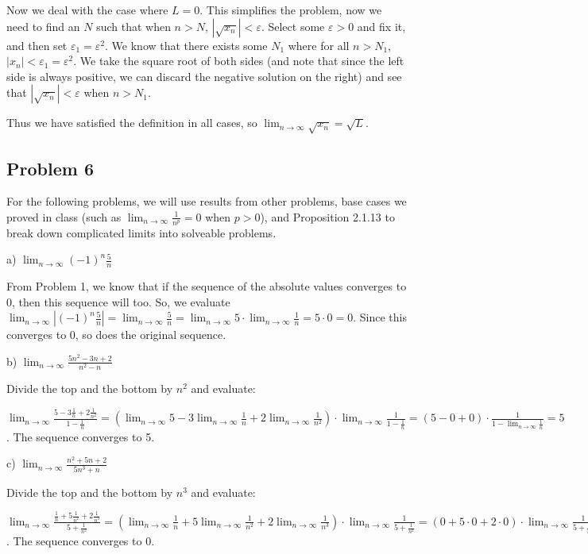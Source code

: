 \documentclass[11pt]{article}
\begin{document}
Now we deal with the case where $L=0$. This simplifies the problem, now
we need to find an $N$ such that when $n > N$, $\left|\sqrt{x_n}\right|< \varepsilon$.
Select some $\varepsilon > 0$ and fix it, and then set $\varepsilon_1 = \varepsilon^2$.
We know that there exists some $N_1$ where for all $n > N_1$,
$|x_n| < \varepsilon_1 = \varepsilon^2$. We take the square root of both sides (and
note that since the left side is always positive, we can discard the negative 
solution on the right)
and see that $\left| \sqrt{x_n} \right| < \varepsilon$ when $n > N_1$. 

Thus we have satisfied the definition
in all cases, so $\lim_{n\to\infty} \sqrt{x_n} = \sqrt{L}$.

\subsection*{Problem 6}
For the following problems, we will use results from other problems, base cases
we proved in class (such as $\lim_{n\to\infty}\frac{1}{n^p}=0$ when $p>0$), 
and Proposition 2.1.13 to break down complicated limits
into solveable problems.

a) $\lim_{n\to\infty}(-1)^n\frac{5}{n}$

From Problem 1, we know that if the sequence of the absolute values converges to 0, then
this sequence will too. So, we evaluate
$\lim_{n\to\infty}\left|(-1)^n\frac{5}{n}\right| = \lim_{n\to\infty}\frac{5}{n}
= \lim_{n\to\infty}5\cdot\lim_{n\to\infty}\frac{1}{n} = 5\cdot0=0$.
Since this converges to 0, so does the original sequence.

b) $\lim_{n\to\infty}\frac{5n^2-3n+2}{n^2-n} $

Divide the top and the bottom by $n^2$ and evaluate:

$\lim_{n\to\infty}\frac{5-3\frac{1}{n}+2\frac{1}{n^2}}{1-\frac{1}{n}} =
(\lim_{n\to\infty}5-3\lim_{n\to\infty}\frac{1}{n}+2\lim_{n\to\infty}\frac{1}{n^2})
\cdot \lim_{n\to\infty}\frac{1}{1-\frac{1}{n}} =
(5-0+0)\cdot\frac{1}{1-\lim_{n\to\infty}\frac{1}{n}} = 5$. 
The sequence converges to 5.

c) $\lim_{n\to\infty}\frac{n^2+5n+2}{5n^3+n} $

Divide the top and the bottom by $n^3$ and evaluate:

$\lim_{n\to\infty}\frac{\frac{1}{n}+5\frac{1}{n^2}+2\frac{1}{n^3}}{5+\frac{1}{n^2}} =
(\lim_{n\to\infty}\frac{1}{n}+5\lim_{n\to\infty}\frac{1}{n^2}+2\lim_{n\to\infty}
\frac{1}{n^3})\cdot\lim_{n\to\infty}\frac{1}{5+\frac{1}{n^2}} = 
(0+5\cdot0+2\cdot0)\cdot\lim_{n\to\infty}\frac{1}{5+\frac{1}{n^2}} = 
0\cdot\frac{1}{5+\lim_{n\to\infty}\frac{1}{n^2}}=0\cdot\frac{1}{5} = 0$.
The sequence converges to 0.
\end{document}
